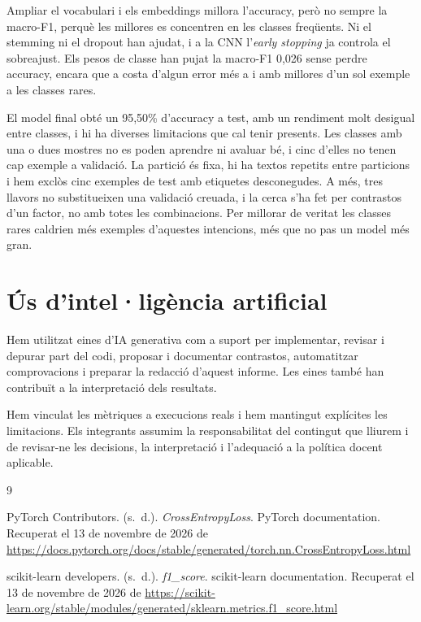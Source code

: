 \documentclass[11pt,a4paper]{article}
\newcommand{\intent}[1]{\texttt{\detokenize{#1}}}
\begin{document}
Ampliar el vocabulari i els embeddings millora l'accuracy, però no sempre la macro-F1, perquè les millores es
concentren en les classes freqüents. Ni el stemming ni el dropout han ajudat, i a la CNN l'\emph{early stopping} ja
controla el sobreajust. Els pesos de classe han pujat la macro-F1 0,026 sense perdre accuracy, encara que a costa
d'algun error més a \intent{flight} i amb millores d'un sol exemple a les classes rares.

El model final obté un 95,50\% d'accuracy a test, amb un rendiment molt desigual entre classes, i hi ha diverses
limitacions que cal tenir presents. Les classes amb una o dues mostres no es poden aprendre ni avaluar bé, i cinc
d'elles no tenen cap exemple a validació. La partició és fixa, hi ha textos repetits entre particions i hem exclòs
cinc exemples de test amb etiquetes desconegudes. A més, tres llavors no substitueixen una validació creuada, i la
cerca s'ha fet per contrastos d'un factor, no amb totes les combinacions. Per millorar de veritat les classes rares
caldrien més exemples d'aquestes intencions, més que no pas un model més gran.

\section{Ús d'intel·ligència artificial}
\label{sec:ia}

Hem utilitzat eines d'IA generativa com a suport per implementar, revisar i depurar part del codi, proposar i
documentar contrastos, automatitzar comprovacions i preparar la redacció d'aquest informe. Les eines també han
contribuït a la interpretació dels resultats.

Hem vinculat les mètriques a execucions reals i hem mantingut explícites les limitacions. Els integrants assumim
la responsabilitat del contingut que lliurem i de revisar-ne les decisions, la interpretació i l'adequació a la
política docent aplicable.

\begin{thebibliography}{9}
\small

PyTorch Contributors. (s.~d.). \emph{CrossEntropyLoss}. PyTorch documentation. Recuperat el 13 de novembre de 2026
de \url{https://docs.pytorch.org/docs/stable/generated/torch.nn.CrossEntropyLoss.html}

scikit-learn developers. (s.~d.). \emph{f1\_score}. scikit-learn documentation. Recuperat el 13 de novembre de
2026 de \url{https://scikit-learn.org/stable/modules/generated/sklearn.metrics.f1_score.html}

\end{thebibliography}
\end{document}
